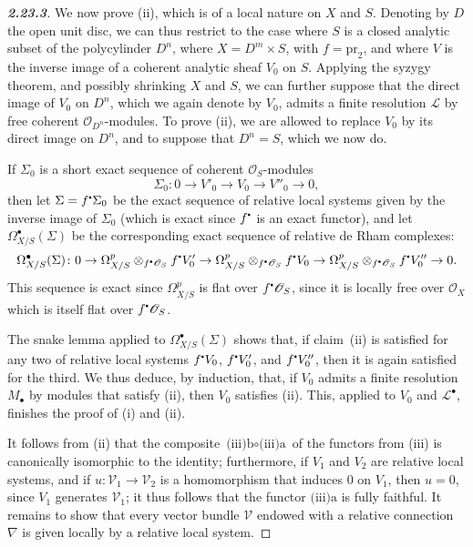 \documentclass{report}
\theoremstyle{plain}
\theoremstyle{definition}
\newcommand{\sh}[1]{{\mathscr{#1}}}
\newcommand{\sbullet}{{\mathbin{\vcenter{\hbox{\scalebox{.5}{$\bullet$}}}}}}
\newcommand{\pr}{\mathrm{pr}}
\newcommand{\oldpage}[1]{\marginpar{\footnotesize$\Big\vert$ \textit{p.~#1}}}
\begin{document}
\begin{proof}[\normalfont\textbf{2.23.3}]
\label{I.2.23.3}
  We now prove (ii), which is of a local nature on $X$ and $S$.
  Denoting by $D$ the open unit disc, we can thus restrict to the case where $S$ is a closed analytic subset of the polycylinder $D^n$, where $X=D^m\times S$, with $f=\pr_2$, and where $V$ is the inverse image of a coherent analytic sheaf $V_0$ on $S$.
  Applying the syzygy theorem, and possibly shrinking $X$ and $S$, we can further suppose that the direct image of $V_0$ on $D^n$, which we again denote by $V_0$, admits a finite resolution $\sh{L}$ by free coherent $\sh{O}_{D^n}$-modules.
  To prove (ii), we are allowed to replace $V_0$ by its direct image on $D^n$, and to suppose that $D^n=S$, which we now do.

  If $\Sigma_0$ is a short exact sequence of coherent $\sh{O}_S$-modules
  \[
    \Sigma_0\colon 0 \to V'_0 \to V_0 \to V''_0 \to 0,
  \]
  then let $\Sigma=f^\sbullet\Sigma_0$ be the exact sequence of relative local systems given by the inverse image of $\Sigma_0$ (which is exact since $f^\sbullet$ is an exact functor), and let $\Omega_{X/S}^\bullet(\Sigma)$ be the corresponding exact sequence of relative de Rham complexes:
  \[
    \Omega_{X/S}^\bullet(\Sigma)\colon 0 \to \Omega_{X/S}^p\otimes_{f^\sbullet\sh{O}_S}f^\sbullet V'_0 \to \Omega_{X/S}^p\otimes_{f^\sbullet\sh{O}_S}f^\sbullet V_0 \to \Omega_{X/S}^p\otimes_{f^\sbullet\sh{O}_S}f^\sbullet V''_0 \to 0.
  \]
  This sequence is exact since $\Omega_{X/S}^p$ is flat over $f^\sbullet\sh{O}_S$, since it is locally free over $\sh{O}_X$ which is itself flat over $f^\sbullet\sh{O}_S$.

  The snake lemma applied to $\Omega_{X/S}^\bullet(\Sigma)$ shows that, if claim~(ii)
\oldpage{17}
  is satisfied for any two of relative local systems $f^\sbullet V_0$, $f^\sbullet V'_0$, and $f^\sbullet V''_0$, then it is again satisfied for the third.
  We thus deduce, by induction, that, if $V_0$ admits a finite resolution $M_\bullet$ by modules that satisfy (ii), then $V_0$ satisfies (ii).
  This, applied to $V_0$ and $\sh{L}^\bullet$, finishes the proof of (i) and (ii).

  It follows from (ii) that the composite $\mbox{(iii)b}\circ\mbox{(iii)a}$ of the functors from (iii) is canonically isomorphic to the identity;
  furthermore, if $V_1$ and $V_2$ are relative local systems, and if $u\colon\sh{V}_1\to\sh{V}_2$ is a homomorphism that induces $0$ on $V_1$, then $u=0$, since $V_1$ generates $\sh{V}_1$;
  it thus follows that the functor $\mbox{(iii)a}$ is fully faithful.
  It remains to show that every vector bundle $\sh{V}$ endowed with a relative connection $\nabla$ is given locally by a relative local system.


\end{proof}
\end{document}
